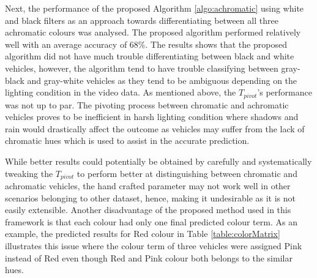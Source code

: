 Next, the performance of the proposed Algorithm \ref{algo:achromatic} using white and black filters as an approach towards differentiating between all three achromatic colours was analysed. The proposed algorithm performed relatively well with an average accuracy of 68\%. The results shows that the proposed algorithm did not have much trouble differentiating between black and white vehicles, however, the algorithm tend to have trouble classifying between gray-black and gray-white vehicles as they tend to be ambiguous depending on the lighting condition in the video data. As mentioned above, the $T_{pivot}$'s performance was not up to par. The pivoting process between chromatic and achromatic vehicles proves to be inefficient in harsh lighting condition where shadows and rain would drastically affect the outcome as vehicles may suffer from the lack of chromatic hues which is used to assist in the accurate prediction.

While better results could potentially be obtained by carefully and systematically tweaking the $T_{pivot}$ to perform better at distinguishing between chromatic and achromatic vehicles, the hand crafted parameter may not work well in other scenarios belonging to other dataset, hence, making it undesirable as it is not easily extensible. Another disadvantage of the proposed method used in this framework is that each colour had only one final predicted colour term. As an example, the predicted results for Red colour in Table \ref{table:colorMatrix} illustrates this issue where the colour term of three vehicles were assigned Pink instead of Red even though Red and Pink colour both belongs to the similar hues.


